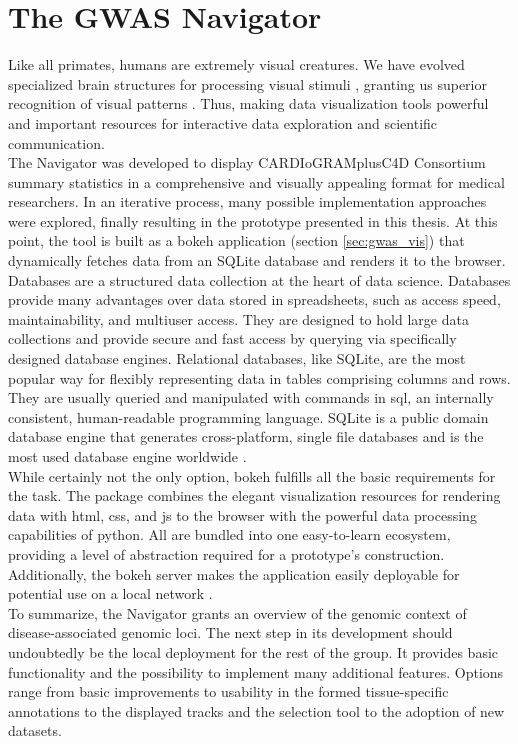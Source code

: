 \section{The GWAS Navigator}
Like all primates, humans are extremely visual creatures. We have evolved specialized brain structures for processing visual stimuli \cite{kaasCurrentResearchOrganization2014}, granting us superior recognition of visual patterns \cite{mattsonSuperiorPatternProcessing2014}. Thus, making data visualization tools powerful and important resources for interactive data exploration and scientific communication.\\
The  Navigator was developed to display CARDIoGRAMplusC4D Consortium \cite{aragamDiscoverySystematicCharacterization2021} summary statistics in a comprehensive and visually appealing format for medical researchers. In an iterative process, many possible implementation approaches were explored, finally resulting in the prototype presented in this thesis. At this point, the tool is built as a bokeh application (section \ref{sec:gwas_vis}) that dynamically fetches data from an SQLite database and renders it to the browser.\\
Databases are a structured data collection at the heart of data science. Databases provide many advantages over data stored in spreadsheets, such as access speed, maintainability, and multiuser access. They are designed to hold large data collections and provide secure and fast access by querying via specifically designed database engines. Relational databases, like SQLite, are the most popular way for flexibly representing data in tables comprising columns and rows. They are usually queried and manipulated with commands in \ac{sql}, an internally consistent, human-readable programming language. \cite{oraclecorporationWhatDatabase2022, oraclecorporationWhatRelationalDatabase2022} SQLite is a public domain database engine that generates cross-platform, single file databases and is the most used database engine worldwide \cite{thesqliteconsortiumSQLite2022}.\\
While certainly not the only option, bokeh fulfills all the basic requirements for the task. The package combines the elegant visualization resources for rendering data with \ac{html}, \ac{css}, and \ac{js} to the browser with the powerful data processing capabilities of python. All are bundled into one easy-to-learn ecosystem, providing a level of abstraction required for a prototype's construction. Additionally, the bokeh server makes the application easily deployable for potential use on a local network \cite{bokehdevelopmentteamBokehPythonLibrary2022}. \\
To summarize, the  Navigator grants an overview of the genomic context of disease-associated genomic loci. The next step in its development should undoubtedly be the local deployment for the rest of the group. It provides basic functionality and the possibility to implement many additional features. Options range from basic improvements to usability in the formed tissue-specific annotations to the displayed tracks and the selection tool to the adoption of new datasets.


